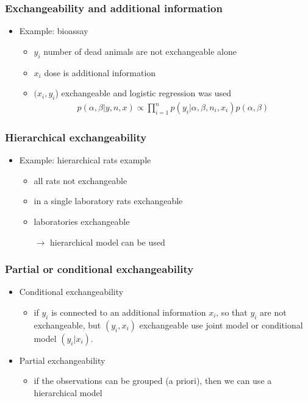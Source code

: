 \documentclass[10pt]{beamer}
\begin{document}
\begin{frame}

\frametitle{Exchangeability and additional information}

  \begin{itemize}
  \item Example: bioassay
    \begin{itemize}
      \item<+-> $y_i$ number of dead animals are not exchangeable alone
      \item<+-> $x_i$ dose is additional information
      \item<+-> $(x_i,y_i$) exchangeable and logistic regression was used
    \begin{align*}
      p(\alpha,\beta|y,n,x)\propto \prod_{i=1}^n p(y_i|\alpha,\beta,n_i,x_i)p(\alpha,\beta)
    \end{align*}
    \end{itemize}
  \end{itemize}
\end{frame}

\begin{frame}

\frametitle{Hierarchical exchangeability}

  \begin{itemize}
  \item Example: hierarchical rats example
    \begin{itemize}
    \item<+-> all rats not exchangeable
    \item<+-> in a single laboratory rats exchangeable
    \item<+-> laboratories exchangeable

    \pause

    $\rightarrow$ hierarchical model can be used
    \end{itemize}
  \end{itemize}
\end{frame}

\begin{frame}

\frametitle{Partial or conditional exchangeability}

\begin{itemize}
  \item Conditional exchangeability
    \begin{itemize}
    \item if $y_i$ is connected to an additional information $x_i$, so
      that $y_i$ are not exchangeable, but $(y_i,x_i)$ exchangeable
      use joint model or conditional model $(y_i|x_i)$.
    \end{itemize}
  \item<2-> Partial exchangeability
    \begin{itemize}
    \item if the observations can be grouped (a priori), then we can use a
      hierarchical model
    \end{itemize}
\end{itemize}
\end{frame}
\end{document}
